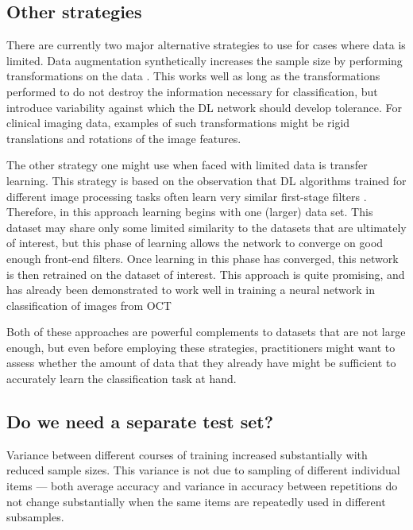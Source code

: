 \subsection{Other strategies}

There are currently two major alternative strategies to use for cases where data
is limited. Data augmentation synthetically increases the sample size by
performing transformations on the data \citep{Ciresan2011-ko}. This works well
as long as the transformations performed to do not destroy the information
necessary for classification, but introduce variability against which the DL
network should develop tolerance. For clinical imaging data, examples of such
transformations might be rigid translations and rotations of the image features.

The other strategy one might use when faced with limited data is transfer
learning. This strategy is based on the observation that DL algorithms trained
for different image processing tasks often learn very similar first-stage
filters \citep{Bengio2012-nh}. Therefore, in this approach learning begins with
one (larger) data set. This dataset may share only some limited similarity to
the datasets that are ultimately of interest, but this phase of learning allows
the network to converge on good enough front-end filters. Once learning in this
phase has converged, this network is then retrained on the dataset of interest.
This approach is quite promising, and has already been demonstrated to work
well in training a neural network in classification of images from OCT
\citep{Kermany2018-bq}

Both of these approaches are powerful complements to datasets that are not large
enough, but even before employing these strategies, practitioners might want to
assess whether the amount of data that they already have might be sufficient to
accurately learn the classification task at hand.

\subsection{Do we need a separate test set?}

Variance between different courses of training increased substantially with
reduced sample sizes. This variance is not due to sampling of different
individual items --- both average accuracy and variance in accuracy between
repetitions do not change substantially when the same items are repeatedly used
in different subsamples.

